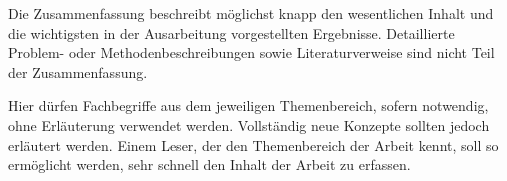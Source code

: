   Die Zusammenfassung beschreibt möglichst knapp den wesentlichen Inhalt
  und die wichtigsten in der Ausarbeitung vorgestellten Ergebnisse.
  Detaillierte Problem- oder Methodenbeschreibungen sowie Literaturverweise
  sind nicht Teil der Zusammenfassung.
  
  Hier dürfen Fachbegriffe aus dem jeweiligen Themenbereich,
  sofern notwendig, ohne Erläuterung verwendet werden.
  Vollständig neue Konzepte sollten jedoch erläutert werden.
  Einem Leser, der den Themenbereich der Arbeit kennt,
  soll so ermöglicht werden, sehr schnell den Inhalt der Arbeit zu erfassen.
